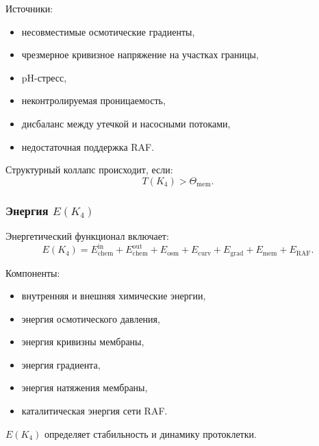 Источники:
\begin{itemize}
    \item несовместимые осмотические градиенты,
    \item чрезмерное кривизное напряжение на участках границы,
    \item pH-стресс,
    \item неконтролируемая проницаемость,
    \item дисбаланс между утечкой и насосными потоками,
    \item недостаточная поддержка RAF.
\end{itemize}

Структурный коллапс происходит, если:
\[
T(K_4) > \Theta_{\mathrm{mem}}.
\]

\subsubsection{Энергия \texorpdfstring{$E(K_4)$}{E(K_4)}}

Энергетический функционал включает:
\[
E(K_4) =
E_{\mathrm{chem}}^{\mathrm{in}} + E_{\mathrm{chem}}^{\mathrm{out}}
+ E_{\mathrm{osm}} + E_{\mathrm{curv}}
+ E_{\mathrm{grad}} + E_{\mathrm{mem}}
+ E_{\mathrm{RAF}}.
\]

Компоненты:
\begin{itemize}
    \item внутренняя и внешняя химические энергии,
    \item энергия осмотического давления,
    \item энергия кривизны мембраны,
    \item энергия градиента,
    \item энергия натяжения мембраны,
    \item каталитическая энергия сети RAF.
\end{itemize}

$E(K_4)$ определяет стабильность и динамику протоклетки.

